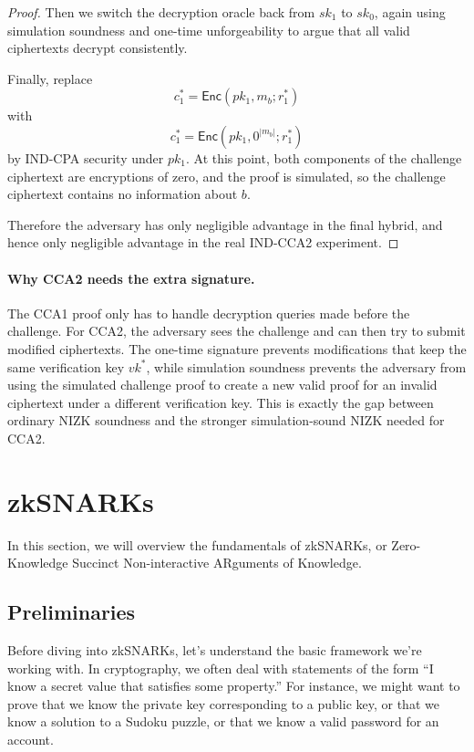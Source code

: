 \begin{proof}
Then we switch the decryption oracle back from $sk_1$ to $sk_0$, again using
simulation soundness and one-time unforgeability to argue that all valid
ciphertexts decrypt consistently.

Finally, replace
\[
c_1^*=\mathsf{Enc}(pk_1,m_b;r_1^*)
\]
with
\[
c_1^*=\mathsf{Enc}(pk_1,0^{|m_b|};r_1^*)
\]
by IND-CPA security under $pk_1$. At this point, both components of the challenge
ciphertext are encryptions of zero, and the proof is simulated, so the challenge
ciphertext contains no information about $b$.

Therefore the adversary has only negligible advantage in the final hybrid, and
hence only negligible advantage in the real IND-CCA2 experiment.
\end{proof}

\paragraph{Why CCA2 needs the extra signature.}

The CCA1 proof only has to handle decryption queries made before the challenge.
For CCA2, the adversary sees the challenge and can then try to submit modified
ciphertexts. The one-time signature prevents modifications that keep the same
verification key $vk^*$, while simulation soundness prevents the adversary from
using the simulated challenge proof to create a new valid proof for an invalid
ciphertext under a different verification key. This is exactly the gap between
ordinary NIZK soundness and the stronger simulation-sound NIZK needed for CCA2.

\section{zkSNARKs}

In this section, we will overview the fundamentals of zkSNARKs, or Zero-Knowledge Succinct Non-interactive ARguments of Knowledge.

\subsection{Preliminaries}

Before diving into zkSNARKs, let's understand the basic framework we're working with. In cryptography, we often deal with statements of the form ``I know a secret value that satisfies some property.'' For instance, we might want to prove that we know the private key corresponding to a public key, or that we know a solution to a Sudoku puzzle, or that we know a valid password for an account.

